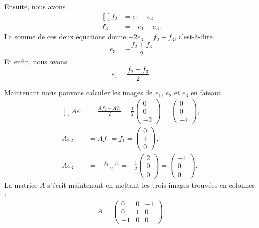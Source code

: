 Ensuite, nous avons
\begin{equation}
	\begin{aligned}[]
		f_2 & =e_1-e_3   \\
		f_3 & =-e_1-e_3.
	\end{aligned}
\end{equation}
La somme de ces deux équations donne \( -2e_3=f_2+f_3\), c'est-à-dire
\begin{equation}
	e_3=-\frac{ f_2+f_3 }{ 2 }
\end{equation}
Et enfin, nous avons
\begin{equation}
	e_1=\frac{ f_2-f_3 }{ 2 }.
\end{equation}

Maintenant nous pouvons calculer les images de \( e_1\), \( e_2\) et \( e_3\) en faisant
\begin{equation}
	\begin{aligned}[]
		Ae_1 & =\frac{ Af_2-Af_3 }{ 2 }=\frac{1 }{2}\begin{pmatrix}
			0 \\
			0 \\
			-2
		\end{pmatrix}=\begin{pmatrix}
			0 \\
			0 \\
			-1
		\end{pmatrix},  \\
		Ae_2 & =Af_1=f_1=\begin{pmatrix}
			0 \\
			1 \\
			0
		\end{pmatrix},                                                        \\
		Ae_3 & =-\frac{ f_2-f_3 }{ 2 }=-\frac{ 1 }{2}\begin{pmatrix}
			2 \\
			0 \\
			0
		\end{pmatrix}=\begin{pmatrix}
			-1 \\
			0  \\
			0
		\end{pmatrix}.
	\end{aligned}
\end{equation}
La matrice \( A\) s'écrit maintenant en mettant les trois images trouvées en colonnes :
\begin{equation}
	A=\begin{pmatrix}
		0  & 0 & -1 \\
		0  & 1 & 0  \\
		-1 & 0 & 0
	\end{pmatrix}.
\end{equation}

